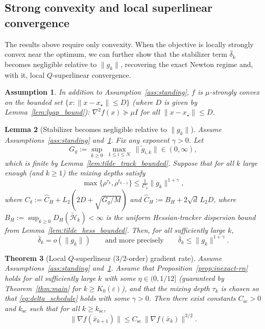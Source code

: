 \documentclass[10pt,twocolumn,letterpaper]{article}
\theoremstyle{compact}
\newtheorem{theorem}{Theorem}[section]
\newtheorem{lemma}[theorem]{Lemma}
\newtheorem{assumption}[theorem]{Assumption}
\theoremstyle{compactremark}
\begin{document}
\subsection{Strong convexity and local superlinear convergence}
The results above require only convexity.
When the objective is locally strongly convex near the optimum,
we can further show that the stabilizer term $\bar\delta_k$ becomes
negligible relative to $\|g_k\|$, recovering the exact Newton
regime and, with it, local $Q$-superlinear convergence.

\begin{assumption}\label{ass:strong}
In addition to Assumption~\ref{ass:standing}, $f$ is $\mu$-strongly convex on the bounded set
$\{x:\|x-x_\star\|\le D\}$ (where $D$ is given by Lemma~\ref{lem:lyap_bound}):
$\nabla^2 f(x)\succeq \mu I$ for all $\|x-x_\star\|\le D$.
\end{assumption}

\begin{lemma}[Stabilizer becomes negligible relative to $\|g_k\|$]\label{lem:delta_o_g}
Assume Assumptions~\ref{ass:standing} and~\ref{ass:strong}.
Fix any exponent $\gamma>0$.
Let
\[
G_g:=\sup_{k\ge 0}\ \max_{1\le i\le N}\ \|\tilde g_{i,k}\|\in(0,\infty),
\]
which is finite by Lemma~\ref{lem:tilde_track_bounded}.
Suppose that for all $k$ large enough (and $k\ge 1$) the mixing depths satisfy
\begin{equation}\label{eq:delta_schedule}
\max\{\rho^{\tau_k},\rho^{t_{k-1}}\}\le \tfrac{1}{C_\delta}\|g_k\|^{1+\gamma},
\end{equation}
where $C_\delta:=\hat C_H+L_2(2D+\sqrt{G_g/M})$ and $\hat C_H:=B_H+2\sqrt{d}\,L_2D$,
where $B_H:=\sup_{k\ge0}D_H(\tilde{\mathcal H}_k)<\infty$
is the uniform Hessian-tracker dispersion bound from Lemma~\ref{lem:tilde_hess_bounded}.
Then, for all sufficiently large $k$,
\[
\bar\delta_k = o(\|g_k\|)\qquad\text{and more precisely}\qquad \bar\delta_k\le \|g_k\|^{1+\gamma}.
\]
\end{lemma}

\begin{theorem}[Local $Q$-superlinear ($3/2$-order) gradient rate]\label{thm:superlinear}
Assume Assumptions~\ref{ass:standing} and~\ref{ass:strong}.
Assume that Proposition~\ref{prop:inexact-rn} holds for all sufficiently large $k$ with some $\eta\in(0,1/12]$
(guaranteed by Theorem~\ref{thm:main} for $k\ge K_0(\varepsilon)$),
and that the mixing depth $\tau_k$ is chosen so that \eqref{eq:delta_schedule} holds with some $\gamma>0$.
Then there exist constants $C_{\mathrm{sc}}>0$ and $k_{\mathrm{sc}}$ such that for all $k\ge k_{\mathrm{sc}}$,
\[
\|\nabla f(\bar x_{k+1})\|\le C_{\mathrm{sc}}\,\|\nabla f(\bar x_k)\|^{3/2}.
\]
\end{theorem}
\end{document}
